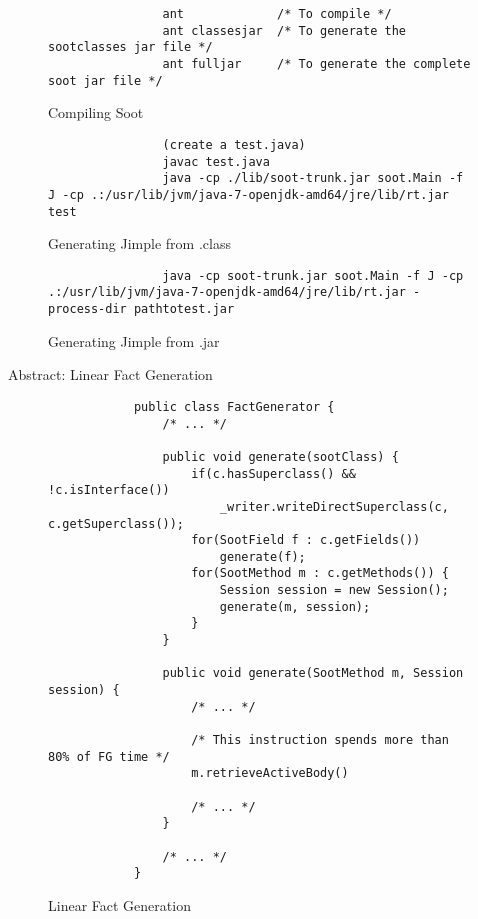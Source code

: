 \documentclass{dithesis}
\begin{document}
        \begin{figure}[H]
            \begin{lstlisting}
                ant             /* To compile */
                ant classesjar  /* To generate the sootclasses jar file */
                ant fulljar     /* To generate the complete soot jar file */
            \end{lstlisting}
        \caption{Compiling Soot}
        \end{figure}

        \begin{figure}[H]
            \begin{lstlisting}
                (create a test.java)
                javac test.java
                java -cp ./lib/soot-trunk.jar soot.Main -f J -cp .:/usr/lib/jvm/java-7-openjdk-amd64/jre/lib/rt.jar test
            \end{lstlisting}
        \caption{Generating Jimple from .class}
        \end{figure}

        \begin{figure}[H]
            \begin{lstlisting}
                java -cp soot-trunk.jar soot.Main -f J -cp .:/usr/lib/jvm/java-7-openjdk-amd64/jre/lib/rt.jar -process-dir pathtotest.jar
            \end{lstlisting}
        \caption{Generating Jimple from .jar}
        \end{figure}



    Abstract: Linear Fact Generation

    \begin{figure}[H]
        \begin{lstlisting}
            public class FactGenerator {
                /* ... */

                public void generate(sootClass) {
                    if(c.hasSuperclass() && !c.isInterface())
                        _writer.writeDirectSuperclass(c, c.getSuperclass());
                    for(SootField f : c.getFields())
                        generate(f);
                    for(SootMethod m : c.getMethods()) {
                        Session session = new Session();
                        generate(m, session);
                    }
                }

                public void generate(SootMethod m, Session session) {
                    /* ... */
                    
                    /* This instruction spends more than 80% of FG time */
                    m.retrieveActiveBody() 
                    
                    /* ... */
                }

                /* ... */
            }
        \end{lstlisting}
    \caption{Linear Fact Generation}
    \end{figure}
\end{document}
